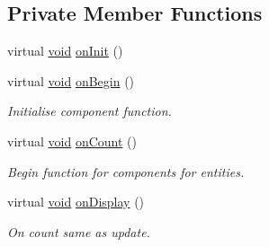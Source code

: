 \subsection*{Private Member Functions}
\begin{DoxyCompactItemize}
\item 
virtual \mbox{\hyperlink{_s_d_l__opengles2__gl2ext_8h_ae5d8fa23ad07c48bb609509eae494c95}{void}} \mbox{\hyperlink{class_aspect_1_1_engine_1_1_component_a3a1fbf76e3fd208be7ffe0ffa449dcf9}{on\+Init}} ()
\item 
virtual \mbox{\hyperlink{_s_d_l__opengles2__gl2ext_8h_ae5d8fa23ad07c48bb609509eae494c95}{void}} \mbox{\hyperlink{class_aspect_1_1_engine_1_1_component_a74ced87351b55406936e9d0009743557}{on\+Begin}} ()
\begin{DoxyCompactList}\small\item\em Initialise component function. \end{DoxyCompactList}\item 
virtual \mbox{\hyperlink{_s_d_l__opengles2__gl2ext_8h_ae5d8fa23ad07c48bb609509eae494c95}{void}} \mbox{\hyperlink{class_aspect_1_1_engine_1_1_component_a02de673a0591459bd0d39e3022c1d3fc}{on\+Count}} ()
\begin{DoxyCompactList}\small\item\em Begin function for components for entities. \end{DoxyCompactList}\item 
virtual \mbox{\hyperlink{_s_d_l__opengles2__gl2ext_8h_ae5d8fa23ad07c48bb609509eae494c95}{void}} \mbox{\hyperlink{class_aspect_1_1_engine_1_1_component_ac67307dba854cdc9535a0de75e5a3d09}{on\+Display}} ()
\begin{DoxyCompactList}\small\item\em On count same as update. \end{DoxyCompactList}\end{DoxyCompactItemize}
